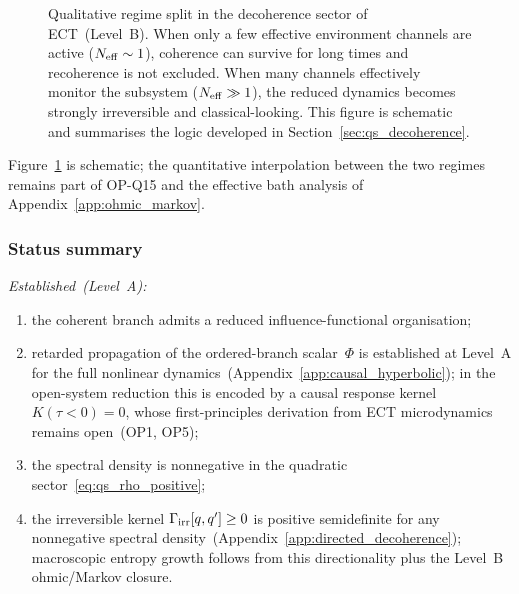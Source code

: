\documentclass[11pt,a4paper]{article}
\numberwithin{equation}{section}
\begin{document}
\begin{figure}[h]
\centering
{}
\caption{Qualitative regime split in the decoherence sector of ECT~(Level~B).
When only a few effective environment channels are active
($N_{\rm eff}\sim1$), coherence can survive for long times
and recoherence is not excluded.
When many channels effectively monitor the subsystem
($N_{\rm eff}\gg1$), the reduced dynamics becomes strongly
irreversible and classical-looking.
This figure is schematic and summarises the logic developed in
Section~\ref{sec:qs_decoherence}.}
\label{fig:qs_decoherence_regimes}
\end{figure}

Figure~\ref{fig:qs_decoherence_regimes} is schematic; the quantitative
interpolation between the two regimes remains part of OP-Q15 and the
effective bath analysis of Appendix~\ref{app:ohmic_markov}.

\subsubsection*{Status summary}

\textit{Established~(Level~A):}
\begin{enumerate}[label=(\roman*)]
  \item the coherent branch admits a reduced influence-functional
    organisation;
  \item retarded propagation of the ordered-branch scalar~$\Phi$ is
    established at Level~A for the full nonlinear
    dynamics~(Appendix~\ref{app:causal_hyperbolic});
    in the open-system reduction this is encoded by a causal
    response kernel $K(\tau<0)=0$, whose first-principles
    derivation from ECT microdynamics remains open~(OP1, OP5);
  \item the spectral density is nonnegative in the quadratic
    sector~\eqref{eq:qs_rho_positive};
  \item the irreversible kernel $\Gamma_{\rm irr}[q,q']\geq 0$ is
    positive semidefinite for any nonnegative spectral
    density~(Appendix~\ref{app:directed_decoherence}); macroscopic
    entropy growth follows from this directionality plus the
    Level~B ohmic/Markov closure.
\end{enumerate}
\end{document}
